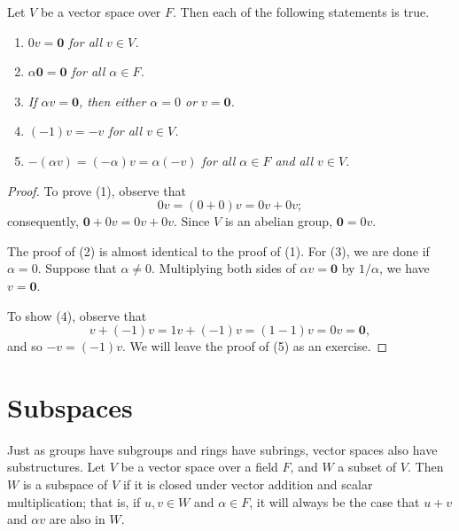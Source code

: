  
\begin{proposition}
Let $V$ be a vector space over $F$. Then each of the following
statements is true. 
\begin{enumerate}

\rm \item \it 
$0v ={\mathbf 0}$ for all $v \in V$.

\rm \item \it 
$\alpha {\mathbf 0} = {\mathbf 0}$ for all $\alpha \in F$.


\rm \item \it 
If $\alpha v = {\mathbf 0}$, then either $\alpha = 0$ or $v = {\mathbf
0}$.  

\rm \item \it
$(-1) v = -v$ for all $v \in V$.

\rm \item \it 
$-(\alpha v) = (-\alpha)v = \alpha(-v)$ for all $\alpha \in F$ and all
$v \in V$. 

\end{enumerate}
\end{proposition}


\begin{proof}
To prove (1), observe that 
\[
0 v = (0 + 0)v = 0v + 0v;
\]
consequently, ${\mathbf 0} + 0 v = 0v + 0v$. Since $V$ is an abelian
group, ${\mathbf 0} = 0v$. 


The proof of (2) is almost identical to the proof of (1). For (3), we
are done if $\alpha = 0$.  Suppose that $\alpha \neq 0$. Multiplying
both sides of $\alpha v = {\mathbf 0}$ by $1/ \alpha$, we have $v =
{\mathbf 0}$.


To show (4), observe that
\[
v + (-1)v = 1v + (-1)v = (1-1)v = 0v = {\mathbf 0},
\]
and so $-v = (-1)v$. We will leave the proof of (5) as an exercise.
\end{proof}
 
 
 
\section{Subspaces}


Just as groups have subgroups and rings have subrings, vector spaces
also have substructures. Let $V$ be a vector space over a field $F$,
and $W$ a subset of $V$. Then $W$ is a {\bfi subspace\/} of $V$ if it is closed under vector addition and
scalar multiplication; that is, if $u, v \in W$ and $\alpha
\in F$, it will always be the case that $u+v$ and $\alpha v$ are also
in $W$.   
 

